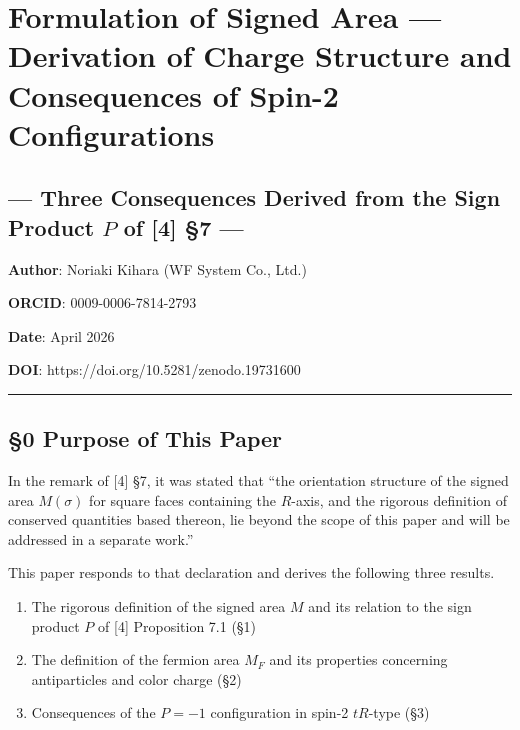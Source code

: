 \documentclass[
  a4paper,11pt]{article}
\author{}
\date{}
\providecommand{\tightlist}{%
  \setlength{\itemsep}{0pt}\setlength{\parskip}{0pt}}
\begin{document}
\section{Formulation of Signed Area --- Derivation of Charge Structure
and Consequences of Spin-2
Configurations}\label{formulation-of-signed-area-derivation-of-charge-structure-and-consequences-of-spin-2-configurations}

\subsection{\texorpdfstring{--- Three Consequences Derived from the Sign
Product \(P\) of {[}4{]} §7
---}{--- Three Consequences Derived from the Sign Product P of {[}4{]} §7 ---}}\label{three-consequences-derived-from-the-sign-product-p-of-4-7}

\textbf{Author}: Noriaki Kihara (WF System Co., Ltd.)

\textbf{ORCID}: 0009-0006-7814-2793

\textbf{Date}: April 2026

\textbf{DOI}: https://doi.org/10.5281/zenodo.19731600

\begin{center}\rule{0.5\linewidth}{0.5pt}\end{center}

\subsection{§0 Purpose of This Paper}\label{purpose-of-this-paper}

In the remark of {[}4{]} §7, it was stated that ``the orientation
structure of the signed area \(M(\sigma)\) for square faces containing
the \(R\)-axis, and the rigorous definition of conserved quantities
based thereon, lie beyond the scope of this paper and will be addressed
in a separate work.''

This paper responds to that declaration and derives the following three
results.

\begin{enumerate}
\def\labelenumi{\arabic{enumi}.}
\tightlist
\item
  The rigorous definition of the signed area \(M\) and its relation to
  the sign product \(P\) of {[}4{]} Proposition 7.1 (§1)
\item
  The definition of the fermion area \(M_F\) and its properties
  concerning antiparticles and color charge (§2)
\item
  Consequences of the \(P = -1\) configuration in spin-2 \(tR\)-type
  (§3)
\end{enumerate}
\end{document}
